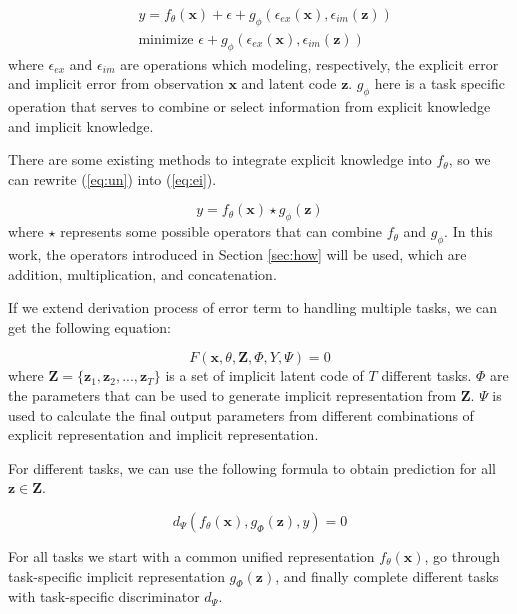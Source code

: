 \documentclass[10pt,twocolumn,letterpaper]{article}
\begin{document}
\begin{equation}
\begin{split}
& y = f_{\theta}(\mathbf{x}) + \epsilon + g_{\phi}(\epsilon_{ex}(\mathbf{x}), \epsilon_{im}(\mathbf{z})) \\
& \text{minimize } \epsilon + g_{\phi}(\epsilon_{ex}(\mathbf{x}), \epsilon_{im}(\mathbf{z}))
\end{split}
\label{eq:un}
\end{equation}
where $\epsilon_{ex}$ and $\epsilon_{im}$ are operations which modeling, respectively, the explicit error and implicit error from observation $\mathbf{x}$ and latent code $\mathbf{z}$. $g_{\phi}$ here is a task specific operation that serves to combine or select information from explicit knowledge and implicit knowledge.

There are some existing methods to integrate explicit knowledge into $f_{\theta}$, so we can rewrite (\ref{eq:un}) into (\ref{eq:ei}).

\begin{equation}
y = f_{\theta}(\mathbf{x}) \star g_{\phi}(\mathbf{z})
\label{eq:ei}
\end{equation}
where $\star$ represents some possible operators that can combine $f_{\theta}$ and $g_{\phi}$. In this work, the operators introduced in Section \ref{sec:how} will be used, which are addition, multiplication, and concatenation.

If we extend derivation process of error term to handling multiple tasks, we can get the following equation:

\begin{equation}
F(\mathbf{x}, \theta, \mathbf{Z}, \Phi, Y, \Psi) = 0
\label{eq:u}
\end{equation}
where $\mathbf{Z} = \{\mathbf{z}_{1}, \mathbf{z}_{2}, ..., \mathbf{z}_{T}\}$ is a set of implicit latent code of $T$ different tasks. $\Phi$ are the parameters that can be used to generate implicit representation from $\mathbf{Z}$. $\Psi$ is used to calculate the final output parameters from different combinations of explicit representation and implicit representation.

For different tasks, we can use the following formula to obtain prediction for all $\mathbf{z} \in \mathbf{Z}$. 

\begin{equation}
d_{\Psi}(f_{\theta}(\mathbf{x}), g_{\Phi}(\mathbf{z}), y) = 0
\label{eq:n}
\end{equation}

For all tasks we start with a common unified representation $f_{\theta}(\mathbf{x})$, go through task-specific implicit representation $g_{\Phi}(\mathbf{z})$, and finally complete different tasks with task-specific discriminator $d_{\Psi}$.
\end{document}
